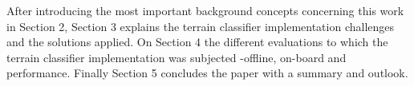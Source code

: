 After introducing the most important background concepts concerning this work in Section 2, Section 3 explains the terrain classifier implementation challenges and the solutions applied. 
On Section 4 the different evaluations to which the terrain classifier implementation was subjected -offline, on-board and performance.
Finally Section 5 concludes the paper with a summary and outlook.